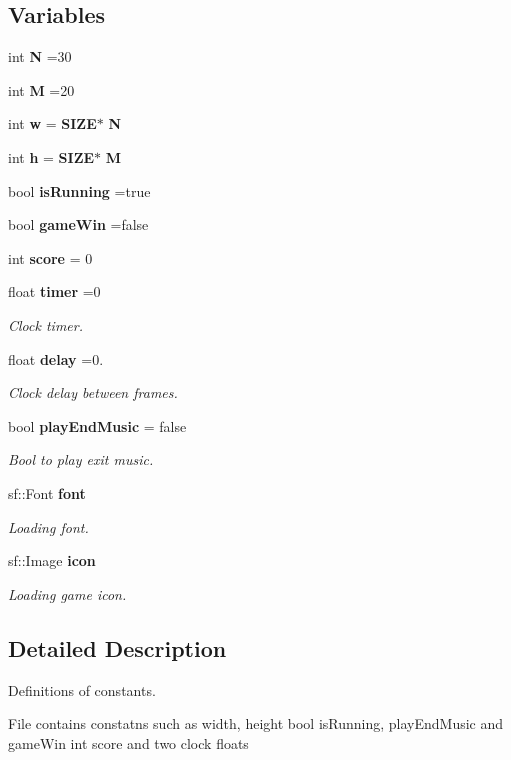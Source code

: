 \subsection*{Variables}
\begin{DoxyCompactItemize}
\item 
int \textbf{ N} =30
\item 
int \textbf{ M} =20
\item 
int \textbf{ w} = \textbf{ S\+I\+ZE}$\ast$\textbf{ N}
\item 
int \textbf{ h} = \textbf{ S\+I\+ZE}$\ast$\textbf{ M}
\item 
bool \textbf{ is\+Running} =true
\item 
bool \textbf{ game\+Win} =false
\item 
int \textbf{ score} = 0
\item 
float \textbf{ timer} =0
\begin{DoxyCompactList}\small\item\em Clock timer. \end{DoxyCompactList}\item 
float \textbf{ delay} =0.
\begin{DoxyCompactList}\small\item\em Clock delay between frames. \end{DoxyCompactList}\item 
bool \textbf{ play\+End\+Music} = false
\begin{DoxyCompactList}\small\item\em Bool to play exit music. \end{DoxyCompactList}\item 
sf\+::\+Font \textbf{ font}
\begin{DoxyCompactList}\small\item\em Loading font. \end{DoxyCompactList}\item 
sf\+::\+Image \textbf{ icon}
\begin{DoxyCompactList}\small\item\em Loading game icon. \end{DoxyCompactList}\end{DoxyCompactItemize}


\subsection{Detailed Description}
Definitions of constants. 

File contains constatns such as width, height bool is\+Running, play\+End\+Music and game\+Win int score and two clock floats 

